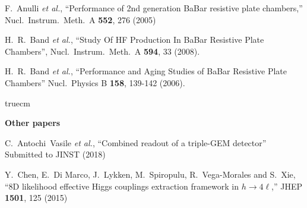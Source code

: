   F.~Anulli {\it et al.},
  ``Performance of 2nd generation BaBar resistive plate chambers,''
  Nucl.\ Instrum.\ Meth.\ A {\bf 552}, 276 (2005)

  H.~R.~Band {\it et al.},
  ``Study Of HF Production In BaBar Resistive Plate Chambers'',
  Nucl.\ Instrum.\ Meth.\  A {\bf 594}, 33 (2008).

  H.~R.~Band {\it et al.},
  ``Performance and Aging Studies of BaBar Resistive Plate Chambers''
  Nucl.\ Physics B {\bf 158}, 139-142 (2006).

 truecm

{\bf Other papers}

  C.~Antochi~Vasile {\it et al.},
  ``Combined readout of a triple-GEM detector''
  Submitted to JINST (2018)

  Y.~Chen, E.~Di Marco, J.~Lykken, M.~Spiropulu, R.~Vega-Morales and S.~Xie,
  ``8D likelihood effective Higgs couplings extraction framework in $h \to 4\ell$,''
  JHEP {\bf 1501}, 125 (2015)

